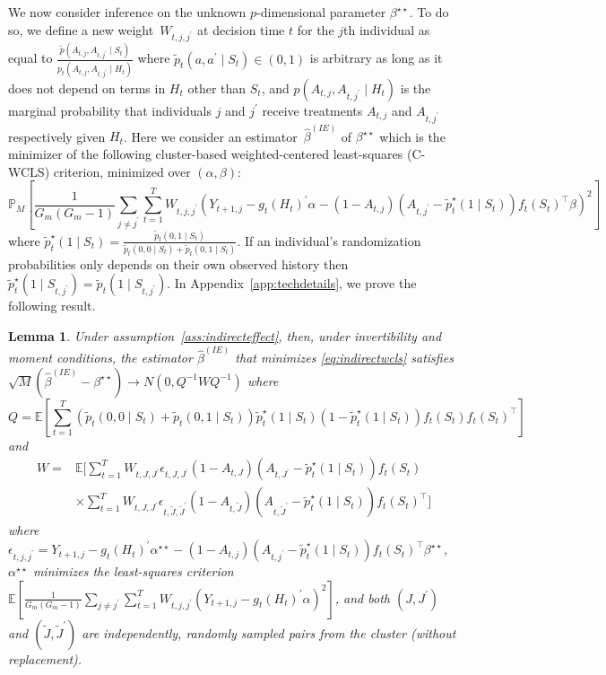 \documentclass[12pt]{article}
\newtheorem{lemma}[thm]{Lemma}
\begin{document}
We now consider inference on the unknown $p$-dimensional parameter $\beta^{\star \star}$. To do so, we define a new weight~$W_{t,j, j^\prime}$ at decision time $t$ for the $j$th individual as equal to $\frac{\tilde p (A_{t,j}, A_{t,j^\prime} \mid S_t)}{p_t (A_{t,j}, A_{t,j^\prime} \mid H_t)}$ where $\tilde p_t (a, a^\prime \mid S_t)\in (0,1)$ is arbitrary as long as it does not depend on terms in $H_t$ other than $S_t$, and $p(A_{t,j}, A_{t,j^\prime} \mid H_t)$ is the marginal probability that individuals $j$ and $j^\prime$ receive treatments $A_{t,j}$ and $A_{t,j^\prime}$ respectively given $H_t$.  Here we consider an estimator~$\hat \beta^{(IE)}$ of $\beta^{\star \star}$ which is the minimizer of the following cluster-based weighted-centered least-squares (C-WCLS) criterion, minimized over $(\alpha, \beta)$:
\begin{equation}
\label{eq:indirectwcls}
\mathbb{P}_M \left[ \frac{1}{G_m (G_m-1)} \sum_{j \neq j^\prime} \sum_{t=1}^T W_{t,j, j^\prime} \left(Y_{t+1,j} - g_t (H_t)^\prime \alpha - (1-A_{t,j}) (A_{t,j^\prime} - \tilde p_t^\star (1\mid S_t)) f_t(S_t)^\top \beta \right)^2 \right]
\end{equation}
where $\tilde p_t^\star (1\mid S_t) = \frac{\tilde p_t (0,1 \mid S_t)}{\tilde p_t (0,0 \mid S_t) + \tilde p_t (0,1 \mid S_t)}$.  If an individual's randomization probabilities only depends on their own observed history then $\tilde p_t^\star (1 \mid S_{t,j^\prime}) = \tilde p_t (1 \mid S_{t,j^\prime})$.  In Appendix~\ref{app:techdetails}, we prove the following result.

\begin{lemma}
\label{lemma:asymnorm2}
Under assumption~\ref{ass:indirecteffect}, then, under invertibility and moment conditions, the estimator $\hat \beta^{(IE)}$ that minimizes \eqref{eq:indirectwcls} satisfies $\sqrt{M} \left( \hat \beta^{(IE)} - \beta^{\star \star} \right) \to N(0, Q^{-1} W Q^{-1})$ where
$$
Q = \mathbb{E} \left[ \sum_{t=1}^T (\tilde p_t (0,0 \mid S_t) + \tilde p_t (0,1 \mid S_t)) \tilde p_t^\star ( 1 \mid S_{t} ) ( 1- \tilde p_t^\star ( 1 \mid S_{t} )) f_t (S_t) f_t (S_t)^\top \right]
$$
and
\begin{align*}
W =  &\mathbb{E} \bigg[ \sum_{t=1}^T W_{t,J,J^\prime} \epsilon_{t,J,J^\prime} (1-A_{t,J})( A_{t,J^\prime} - \tilde p_t^\star( 1 \mid S_{t} )) f_t (S_t) \\
&\times \sum_{t=1}^T W_{t,J,J^\prime} \epsilon_{t, \tilde J, \tilde J^\prime} (1-A_{t,\tilde J}) ( A_{t,\tilde J^\prime} - \tilde p_t^\star( 1 \mid S_{t} )) f_t (S_t)^\top  \bigg]
\end{align*}
where $\epsilon_{t,j,j^\prime} = Y_{t+1,j} - g_t(H_t)^\prime \alpha^{\star \star} - (1-A_{t,j}) (A_{t,j^\prime} - \tilde p_t^\star (1 \mid S_t) ) f_t (S_t)^\top \beta^{\star \star}$, $\alpha^{\star \star}$ minimizes the least-squares criterion $\mathbb{E}  \left[ \frac{1}{G_m (G_m-1)} \sum_{j \neq j^\prime} \sum_{t=1}^T W_{t,j,j^\prime} \left( Y_{t+1,j} - g_t(H_t)^\prime \alpha \right)^2 \right]$, and both $(J,J^\prime)$ and $(\tilde J, \tilde J^\prime)$ are independently, randomly sampled pairs from the cluster (without replacement).
\end{lemma}
\end{document}
